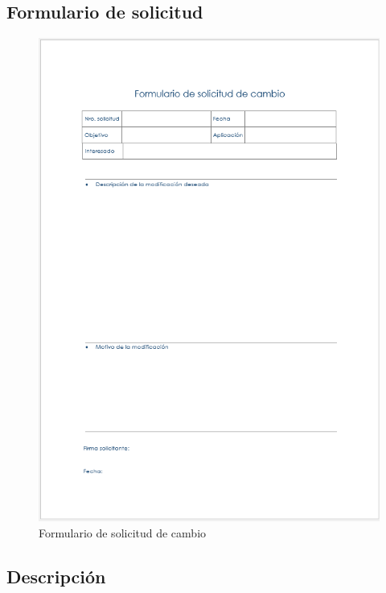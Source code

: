\subsection{Formulario de solicitud}
\begin{figure}[H]
    \centering
    \includegraphics[scale=0.80]{Files/solicCambio.PNG}
    \caption{Formulario de solicitud de cambio}
    \label{fig:clases}
\end{figure}
\subsection{Descripción}

